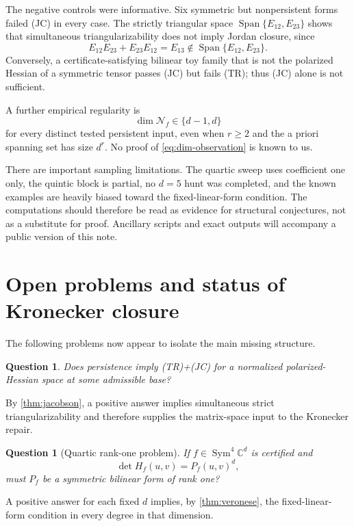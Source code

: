 \documentclass[11pt]{amsart}
\newtheorem{question}[theorem]{Question}
\newcommand{\C}{\mathbb C}
\newcommand{\Sym}{\operatorname{Sym}}
\newcommand{\Span}{\operatorname{Span}}
\newcommand{\Nsp}{\mathcal N}
\begin{document}
The negative controls were informative.  Six symmetric but nonpersistent forms
failed (JC) in every case.  The strictly triangular space
$\Span\{E_{12},E_{23}\}$ shows that simultaneous triangularizability does not
imply Jordan closure, since
\[
 E_{12}E_{23}+E_{23}E_{12}=E_{13}\notin
 \Span\{E_{12},E_{23}\}.
\]
Conversely, a certificate-satisfying bilinear toy family that is not the
polarized Hessian of a symmetric tensor passes (JC) but fails (TR); thus (JC)
alone is not sufficient.

A further empirical regularity is
\begin{equation}\label{eq:dim-observation}
 \dim\Nsp_f\in\{d-1,d\}
\end{equation}
for every distinct tested persistent input, even when $r\ge2$ and the a priori
spanning set has size $d^r$.  No proof of \eqref{eq:dim-observation} is known to
us.

There are important sampling limitations.  The quartic sweep uses coefficient
one only, the quintic block is partial, no $d=5$ hunt was completed, and the
known examples are heavily biased toward the fixed-linear-form condition.  The
computations should therefore be read as evidence for structural conjectures,
not as a substitute for proof.  Ancillary scripts and exact outputs will
accompany a public version of this note.

\section{Open problems and status of Kronecker closure}

The following problems now appear to isolate the main missing structure.

\begin{question}\label{q:persist-jc}
Does persistence imply (TR)+(JC) for a normalized polarized-Hessian space at
some admissible base?
\end{question}

By \cref{thm:jacobson}, a positive answer implies simultaneous strict
triangularizability and therefore supplies the matrix-space input to the
Kronecker repair.

\begin{question}[Quartic rank-one problem]\label{q:quartic}
If $f\in\Sym^4\C^d$ is certified and
\[
 \det H_f(u,v)=P_f(u,v)^d,
\]
must $P_f$ be a symmetric bilinear form of rank one?
\end{question}

A positive answer for each fixed $d$ implies, by \cref{thm:veronese}, the
fixed-linear-form condition in every degree in that dimension.
\end{document}
